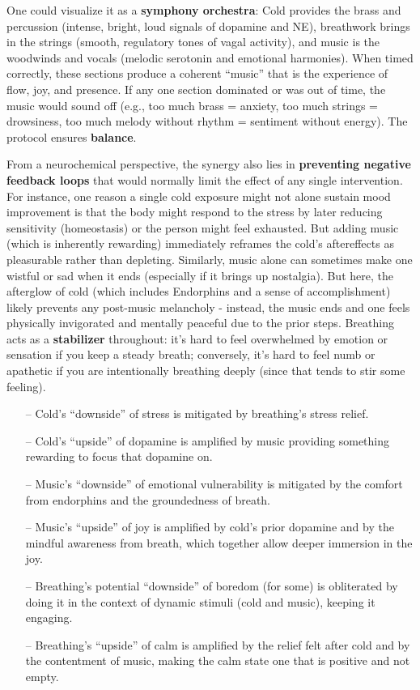 \documentclass[11pt]{article}
\newcommand{\quotes}[1]{``#1''}
\begin{document}
One could visualize it as a \textbf{symphony orchestra}: Cold provides the brass and percussion (intense, bright, loud signals of dopamine and NE), breathwork brings in the strings (smooth, regulatory tones of vagal activity), and music is the woodwinds and vocals (melodic serotonin and emotional harmonies). When timed correctly, these sections produce a coherent \quotes{music} that is the experience of flow, joy, and presence. If any one section dominated or was out of time, the music would sound off (e.g., too much brass = anxiety, too much strings = drowsiness, too much melody without rhythm = sentiment without energy). The protocol ensures \textbf{balance}.

From a neurochemical perspective, the synergy also lies in \textbf{preventing negative feedback loops} that would normally limit the effect of any single intervention. For instance, one reason a single cold exposure might not alone sustain mood improvement is that the body might respond to the stress by later reducing sensitivity (homeostasis) or the person might feel exhausted. But adding music (which is inherently rewarding) immediately reframes the cold's aftereffects as pleasurable rather than depleting. Similarly, music alone can sometimes make one wistful or sad when it ends (especially if it brings up nostalgia). But here, the afterglow of cold (which includes Endorphins and a sense of accomplishment) likely prevents any post-music melancholy - instead, the music ends and one feels physically invigorated and mentally peaceful due to the prior steps. Breathing acts as a \textbf{stabilizer} throughout: it's hard to feel overwhelmed by emotion or sensation if you keep a steady breath; conversely, it's hard to feel numb or apathetic if you are intentionally breathing deeply (since that tends to stir some feeling).

\begin{itemize}
	\item[--] Cold's \quotes{downside} of stress is mitigated by breathing's stress relief.
	\item[--] Cold's \quotes{upside} of dopamine is amplified by music providing something rewarding to focus that dopamine on.
	\item[--] Music's \quotes{downside} of emotional vulnerability is mitigated by the comfort from endorphins and the groundedness of breath.
	\item[--] Music's \quotes{upside} of joy is amplified by cold's prior dopamine and by the mindful awareness from breath, which together allow deeper immersion in the joy.
	\item[--] Breathing's potential \quotes{downside} of boredom (for some) is obliterated by doing it in the context of dynamic stimuli (cold and music), keeping it engaging. 
	\item[--] Breathing's \quotes{upside} of calm is amplified by the relief felt after cold and by the contentment of music, making the calm state one that is positive and not empty.
\end{itemize}
\end{document}
